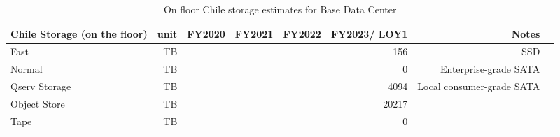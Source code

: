 \tiny \begin{longtable} { |p{}  |r  |r  |r  |r  |r  |r  |r |} 
\caption{On floor Chile storage estimates for Base Data Center \label{tab:chileStorage}}\\ 
\hline 
\textbf{Chile Storage (on the floor)}&\textbf{unit}&\textbf{FY2020}&\textbf{FY2021}&\textbf{FY2022}&\textbf{FY2023/ LOY1}&\textbf{Notes} \\ \hline
{Fast}&{TB}&{}&{}&{}&{156}&{SSD} \\ \hline
{Normal}&{TB}&{}&{}&{}&{0}&{Enterprise-grade SATA} \\ \hline
{Qserv Storage}&{TB}&{}&{}&{}&{4094}&{Local consumer-grade SATA} \\ \hline
{Object Store}&{TB}&{}&{}&{}&{20217}& \\ \hline
{Tape}&{TB}&{}&{}&{}&{0}& \\ \hline
\end{longtable} \normalsize
